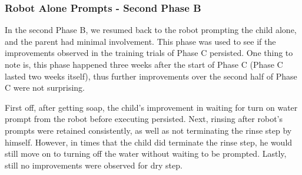 \subsubsection{Robot Alone Prompts - Second Phase B}
In the second Phase B, we resumed back to the robot prompting the child alone, and the parent had minimal involvement.  This phase was used to see if the improvements observed in the training trials of Phase C persisted.  One thing to note is, this phase happened three weeks after the start of Phase C (Phase C lasted two weeks itself), thus further improvements over the second half of Phase C were not surprising.

First off, after getting soap, the child's improvement in waiting for turn on water prompt from the robot before executing persisted.  Next, rinsing after robot's prompts were retained consistently, as well as not terminating the rinse step by himself.  However, in times that the child did terminate the rinse step, he would still move on to turning off the water without waiting to be prompted.  Lastly, still no improvements were observed for dry step.

